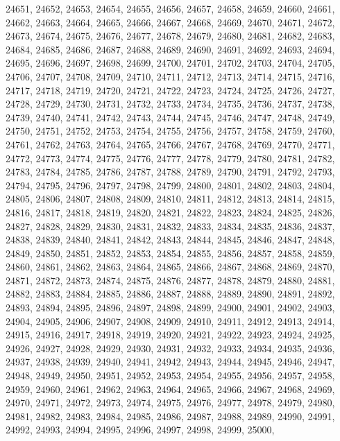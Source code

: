24651,
24652,
24653,
24654,
24655,
24656,
24657,
24658,
24659,
24660,
24661,
24662,
24663,
24664,
24665,
24666,
24667,
24668,
24669,
24670,
24671,
24672,
24673,
24674,
24675,
24676,
24677,
24678,
24679,
24680,
24681,
24682,
24683,
24684,
24685,
24686,
24687,
24688,
24689,
24690,
24691,
24692,
24693,
24694,
24695,
24696,
24697,
24698,
24699,
24700,
24701,
24702,
24703,
24704,
24705,
24706,
24707,
24708,
24709,
24710,
24711,
24712,
24713,
24714,
24715,
24716,
24717,
24718,
24719,
24720,
24721,
24722,
24723,
24724,
24725,
24726,
24727,
24728,
24729,
24730,
24731,
24732,
24733,
24734,
24735,
24736,
24737,
24738,
24739,
24740,
24741,
24742,
24743,
24744,
24745,
24746,
24747,
24748,
24749,
24750,
24751,
24752,
24753,
24754,
24755,
24756,
24757,
24758,
24759,
24760,
24761,
24762,
24763,
24764,
24765,
24766,
24767,
24768,
24769,
24770,
24771,
24772,
24773,
24774,
24775,
24776,
24777,
24778,
24779,
24780,
24781,
24782,
24783,
24784,
24785,
24786,
24787,
24788,
24789,
24790,
24791,
24792,
24793,
24794,
24795,
24796,
24797,
24798,
24799,
24800,
24801,
24802,
24803,
24804,
24805,
24806,
24807,
24808,
24809,
24810,
24811,
24812,
24813,
24814,
24815,
24816,
24817,
24818,
24819,
24820,
24821,
24822,
24823,
24824,
24825,
24826,
24827,
24828,
24829,
24830,
24831,
24832,
24833,
24834,
24835,
24836,
24837,
24838,
24839,
24840,
24841,
24842,
24843,
24844,
24845,
24846,
24847,
24848,
24849,
24850,
24851,
24852,
24853,
24854,
24855,
24856,
24857,
24858,
24859,
24860,
24861,
24862,
24863,
24864,
24865,
24866,
24867,
24868,
24869,
24870,
24871,
24872,
24873,
24874,
24875,
24876,
24877,
24878,
24879,
24880,
24881,
24882,
24883,
24884,
24885,
24886,
24887,
24888,
24889,
24890,
24891,
24892,
24893,
24894,
24895,
24896,
24897,
24898,
24899,
24900,
24901,
24902,
24903,
24904,
24905,
24906,
24907,
24908,
24909,
24910,
24911,
24912,
24913,
24914,
24915,
24916,
24917,
24918,
24919,
24920,
24921,
24922,
24923,
24924,
24925,
24926,
24927,
24928,
24929,
24930,
24931,
24932,
24933,
24934,
24935,
24936,
24937,
24938,
24939,
24940,
24941,
24942,
24943,
24944,
24945,
24946,
24947,
24948,
24949,
24950,
24951,
24952,
24953,
24954,
24955,
24956,
24957,
24958,
24959,
24960,
24961,
24962,
24963,
24964,
24965,
24966,
24967,
24968,
24969,
24970,
24971,
24972,
24973,
24974,
24975,
24976,
24977,
24978,
24979,
24980,
24981,
24982,
24983,
24984,
24985,
24986,
24987,
24988,
24989,
24990,
24991,
24992,
24993,
24994,
24995,
24996,
24997,
24998,
24999,
25000,
